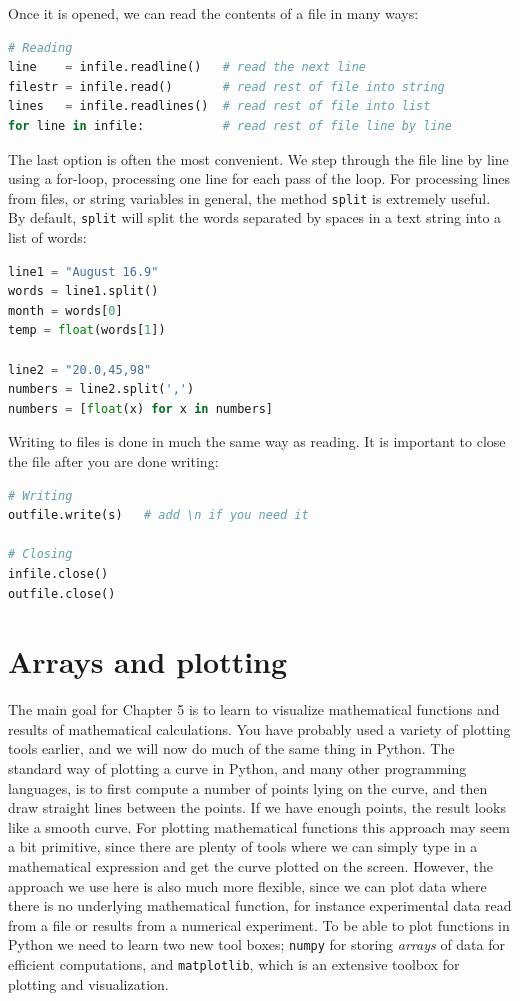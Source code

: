 \documentclass[graybox,envcountchap,sectrefs,final]{svmonodo}
\begin{document}
Once it is opened, we can read the contents of a file in many ways:
\begin{lstlisting}[language=Python,style=blue1]
# Reading
line    = infile.readline()   # read the next line
filestr = infile.read()       # read rest of file into string
lines   = infile.readlines()  # read rest of file into list
for line in infile:           # read rest of file line by line
\end{lstlisting}
The last option is often the most convenient. We step through the file line by line using a for-loop, processing one line
for each pass of the loop. For processing lines from files, or string variables in general, the method \texttt{split} is
extremely useful. By default, \texttt{split} will split the words separated by spaces in a text string into a list of words:
\begin{lstlisting}[language=Python,style=blue1]
line1 = "August 16.9"
words = line1.split()
month = words[0]
temp = float(words[1])

line2 = "20.0,45,98"
numbers = line2.split(',')
numbers = [float(x) for x in numbers]
\end{lstlisting}

Writing to files is done in much the same way as reading. It is important to close the file after you are done writing:
\begin{lstlisting}[language=Python,style=blue1]
# Writing
outfile.write(s)   # add \n if you need it

# Closing
infile.close()
outfile.close()
\end{lstlisting}

\chapter{Arrays and plotting}
\label{ch:array_plot}

The main goal for Chapter 5 is to learn to visualize mathematical functions and results of
mathematical calculations. You have probably used a variety of plotting tools earlier, and we will
now do much of the same thing in Python. The standard way of plotting a curve in Python, and
many other programming languages, is to first compute a number of points lying on the
curve, and then draw straight lines between the points. If we have enough points, the result looks
like a smooth curve. For plotting mathematical functions this approach may seem a bit primitive,
since there are plenty of tools where we can simply type in a mathematical expression and get the
curve plotted on the screen. However,
the approach we use here is also much more flexible, since we can plot data where there is no underlying
mathematical function, for instance experimental data read from a file or results from a numerical
experiment. To be able to plot functions in Python we need to learn two new tool boxes; \texttt{numpy} for
storing \emph{arrays} of data for efficient computations, and \texttt{matplotlib}, which is an extensive toolbox
for plotting and visualization.
\end{document}

